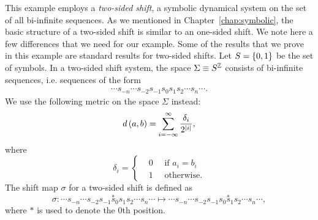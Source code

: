 \documentclass[10pt,twoside,draft]{book}
\begin{document}
\begin{example}
  \citep{blanchard}
  This example employs a \textit{two-sided shift}, a symbolic dynamical system on the set of all bi-infinite sequences.
  As we mentioned in Chapter~\ref{chap:symbolic}, the basic structure of a two-sided shift is similar to an one-sided shift.
  We note here a few differences that we need for our example.
  Some of the results that we prove in this example are standard results for two-sided shifts.
  Let $S = \left \{ 0,1 \right \}$ be the set of symbols.
  In a two-sided shift system, the space $\Sigma \equiv S^{\mathbb{Z}}$ consists of bi-infinite sequences, i.e. sequences of the form
  \begin{align*}
    \cdots s_{-n} \cdots s_{-2} s_{-1} s_0 s_1 s_2 \cdots s_n \cdots.
  \end{align*}
  We use the following metric on the space $\Sigma$ instead:
  \begin{equation*}
    d\left( a,b \right) = \sum\limits_{i = -\infty}^{\infty} \frac{\delta_i}{2^{\left | i \right |}},
  \end{equation*}
  where
  \begin{equation*}
    \delta_i = 
    \begin{cases}
      &0 \quad \mbox{ if } a_i = b_i  \\
      &1 \quad \mbox{ otherwise.}
    \end{cases}
  \end{equation*}
  The shift map $\sigma$ for a two-sided shift is defined as
  \begin{equation*}
    \sigma: 
    \cdots s_{-n} \cdots s_{-2} s_{-1} \overset{*}s_0 s_1 s_2 \cdots s_n \cdots
    \mapsto
    \cdots s_{-n} \cdots s_{-2} s_{-1} s_0 \overset{*}s_1 s_2 \cdots s_n \cdots,
  \end{equation*}
  where $*$ is used to denote the 0th position.


\end{example}
\end{document}
